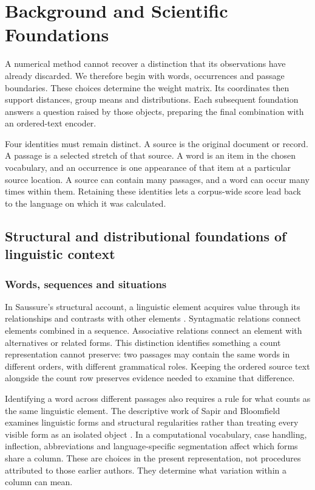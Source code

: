 \documentclass[10pt,letterpaper]{article}
\begin{document}
\section{Background and Scientific Foundations}
A numerical method cannot recover a distinction that its observations have already discarded. We therefore begin with words, occurrences and passage boundaries. These choices determine the weight matrix. Its coordinates then support distances, group means and distributions. Each subsequent foundation answers a question raised by those objects, preparing the final combination with an ordered-text encoder.\par

Four identities must remain distinct. A source is the original document or record. A passage is a selected stretch of that source. A word is an item in the chosen vocabulary, and an occurrence is one appearance of that item at a particular source location. A source can contain many passages, and a word can occur many times within them. Retaining these identities lets a corpus-wide score lead back to the language on which it was calculated.\par

\subsection{Structural and distributional foundations of linguistic context}
\subsubsection{Words, sequences and situations}
In Saussure's structural account, a linguistic element acquires value through its relationships and contrasts with other elements \cite{saussure}. Syntagmatic relations connect elements combined in a sequence. Associative relations connect an element with alternatives or related forms. This distinction identifies something a count representation cannot preserve: two passages may contain the same words in different orders, with different grammatical roles. Keeping the ordered source text alongside the count row preserves evidence needed to examine that difference.\par

Identifying a word across different passages also requires a rule for what counts as the same linguistic element. The descriptive work of Sapir and Bloomfield examines linguistic forms and structural regularities rather than treating every visible form as an isolated object \cite{sapir,bloomfield}. In a computational vocabulary, case handling, inflection, abbreviations and language-specific segmentation affect which forms share a column. These are choices in the present representation, not procedures attributed to those earlier authors. They determine what variation within a column can mean.\par
\end{document}

